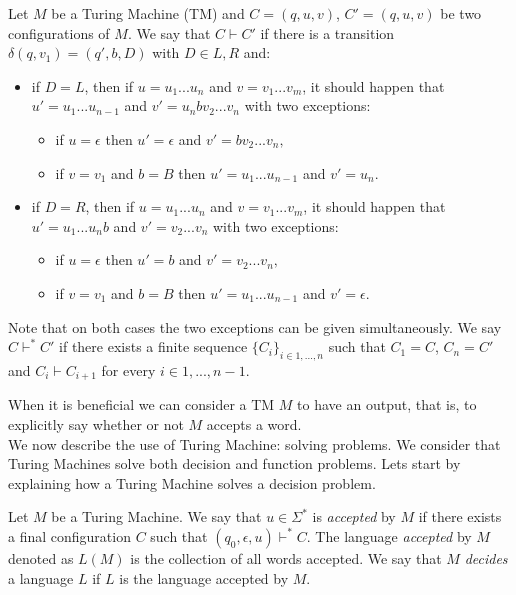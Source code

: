 \begin{definition}\label{def:paso}
  Let $M$ be a Turing Machine (TM) and $C=(q,u,v)$, $C'=(q,u,v)$ be two configurations of $M$. We say that $C\vdash C'$ if there is a transition $\delta (q,v_1) = (q', b, D) $ with $D\in{L,R}$ and:
  \begin{itemize}
  \item if $D=L$, then if $u=u_1...u_n$ and $v = v_1...v_m$, it should happen that $u' = u_1...u_{n-1}$ and $v' = u_n bv_2...v_n$ with two exceptions:
    \begin{itemize}
    \item if $u=\epsilon$ then $u' = \epsilon$ and $v' = bv_2...v_n,$
    \item if $v = v_1$ and $b =B$ then $u'=u_1...u_{n-1}$ and $v' = u_n$.
    \end{itemize}

  \item if $D=R$, then if $u=u_1...u_n$ and $v = v_1...v_m$, it should happen that $u' = u_1...u_{n}b$ and $v' = v_2...v_n$ with two exceptions:
    \begin{itemize}
    \item if $u=\epsilon$ then $u' = b$ and $v' =v_2...v_n,$
    \item if $v = v_1$ and $b =B$ then $u'=u_1...u_{n-1}$ and $v' = \epsilon$.
    \end{itemize}
  \end{itemize}

  Note that on both cases the two exceptions can be given simultaneously. We say $C\vdash^* C'$ if there exists a finite sequence $\{C_i\}_{i\in 1,...,n}$ such that $C_1 = C$, $C_n=C'$ and $C_i\vdash C_{i+1}$ for every $i\in 1,...,n-1$.  
  \end{definition}

  When it is beneficial we can consider a TM $M$ to have an output, that is, to explicitly say whether or not $M$ accepts a word.\\

  
  We now describe the use of Turing Machine: solving problems. We consider that Turing Machines solve both decision and function problems. Lets start by explaining how a Turing Machine solves a decision problem.

  \begin{definition}
     Let $M$ be a Turing Machine. We say that $u\in\Sigma^*$ is \emph{accepted} by $M$ if there exists a final configuration $C$ such that $(q_0,\epsilon,u)\vdash^* C$. The language \emph{accepted} by $M$ denoted as $L(M)$ is the collection of all words accepted. We say that $M$ \emph{decides} a language $L$ if $L$ is the language accepted by $M$.
  \end{definition}

